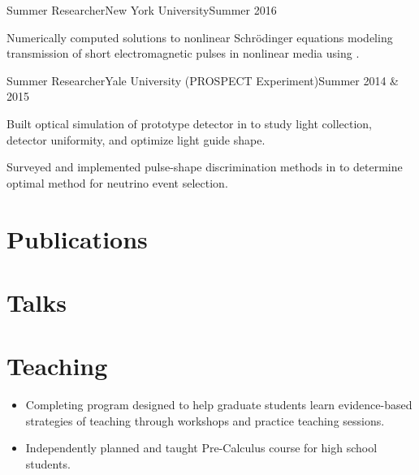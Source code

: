 \documentclass{cultvoucher}
\begin{document}
\begin{entry}{Summer Researcher}{New York University}{Summer 2016}
	\item Numerically computed solutions to nonlinear Schr\"{o}dinger equations modeling transmission of short electromagnetic pulses in nonlinear media using .
\end{entry}

\begin{entry}{Summer Researcher}{Yale University (\textsc{PROSPECT} Experiment)}{Summer 2014 \& 2015}
	\item Built optical simulation of prototype detector in  to study light collection, detector uniformity, and optimize light guide shape.
	\item Surveyed and implemented pulse-shape discrimination methods in  to determine optimal method for neutrino event selection.
\end{entry}

\section{Publications} %

\section{Talks}

\section{Teaching}

\begin{itemize}
	\item Completing program designed to help graduate students learn evidence-based strategies of teaching through workshops and practice teaching sessions.
\end{itemize}

\begin{itemize}
	\item Independently planned and taught Pre-Calculus course for high school students.
\end{itemize}
\end{document}
